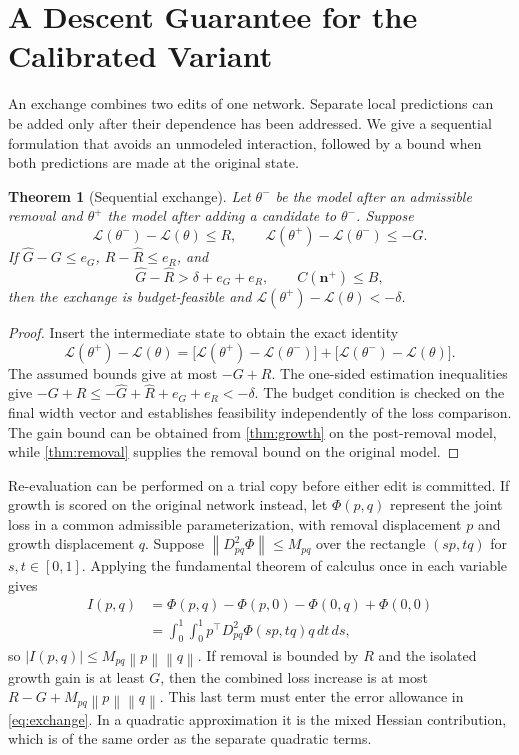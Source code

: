 \documentclass[10pt]{article}
\theoremstyle{paper}
\newtheorem{theorem}{Theorem}[section]
\newcommand{\Lcal}{\mathcal L}
\newcommand{\norm}[1]{\left\lVert #1\right\rVert}
\begin{document}
\section{A Descent Guarantee for the Calibrated Variant}
\label{app:exchange}
An exchange combines two edits of one network. Separate local predictions can be added only after their dependence has been addressed. We give a sequential formulation that avoids an unmodeled interaction, followed by a bound when both predictions are made at the original state.

\begin{theorem}[Sequential exchange]
\label{thm:exchange}
Let $\theta^-$ be the model after an admissible removal and $\theta^+$ the model after adding a candidate to $\theta^-$. Suppose
\[
\Lcal(\theta^-)-\Lcal(\theta)\le R,
\qquad \Lcal(\theta^+)-\Lcal(\theta^-)\le-G.
\]
If $\widehat G-G\le e_G$, $R-\widehat R\le e_R$, and
\[
\widehat G-\widehat R>\delta+e_G+e_R,
\qquad C(\bm n^+)\le B,
\]
then the exchange is budget-feasible and $\Lcal(\theta^+)-\Lcal(\theta)<-\delta$.
\end{theorem}
\begin{proof}
Insert the intermediate state to obtain the exact identity
\[
\Lcal(\theta^+)-\Lcal(\theta)
=\bigl[\Lcal(\theta^+)-\Lcal(\theta^-)\bigr]
+\bigl[\Lcal(\theta^-)-\Lcal(\theta)\bigr].
\]
The assumed bounds give at most $-G+R$. The one-sided estimation inequalities give $-G+R\le-\widehat G+\widehat R+e_G+e_R<-\delta$. The budget condition is checked on the final width vector and establishes feasibility independently of the loss comparison. The gain bound can be obtained from \cref{thm:growth} on the post-removal model, while \cref{thm:removal} supplies the removal bound on the original model.
\end{proof}

Re-evaluation can be performed on a trial copy before either edit is committed. If growth is scored on the original network instead, let $\Phi(p,q)$ represent the joint loss in a common admissible parameterization, with removal displacement $p$ and growth displacement $q$. Suppose $\norm{D_{pq}^2\Phi}\le M_{pq}$ over the rectangle $(sp,tq)$ for $s,t\in[0,1]$. Applying the fundamental theorem of calculus once in each variable gives
\begin{align}
I(p,q)&=\Phi(p,q)-\Phi(p,0)-\Phi(0,q)+\Phi(0,0)\\
&=\int_0^1\int_0^1p^\top D_{pq}^2\Phi(sp,tq)q\,dt\,ds,
\end{align}
so $|I(p,q)|\le M_{pq}\norm p\norm q$. If removal is bounded by $R$ and the isolated growth gain is at least $G$, then the combined loss increase is at most $R-G+M_{pq}\norm p\norm q$. This last term must enter the error allowance in \cref{eq:exchange}. In a quadratic approximation it is the mixed Hessian contribution, which is of the same order as the separate quadratic terms.
\end{document}

